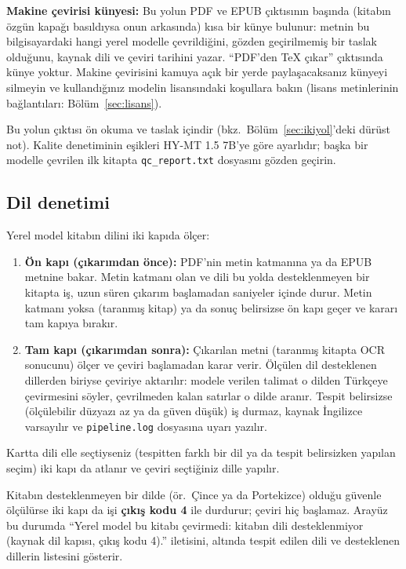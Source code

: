\documentclass[11pt,a4paper]{article}
\newcommand{\dosya}[1]{\texttt{#1}}
\begin{document}
\begin{notkutu}
\textbf{Makine çevirisi künyesi:} Bu yolun PDF ve EPUB çıktısının başında
(kitabın özgün kapağı basıldıysa onun arkasında) kısa bir künye bulunur:
metnin bu bilgisayardaki hangi yerel modelle çevrildiğini, gözden geçirilmemiş
bir taslak olduğunu, kaynak dili ve çeviri tarihini yazar. ``PDF'den TeX
çıkar'' çıktısında künye yoktur. Makine çevirisini kamuya açık bir yerde
paylaşacaksanız künyeyi silmeyin ve kullandığınız modelin lisansındaki
koşullara bakın (lisans metinlerinin bağlantıları: Bölüm~\ref{sec:lisans}).
\end{notkutu}

Bu yolun çıktısı ön okuma ve taslak içindir (bkz.\ Bölüm~\ref{sec:ikiyol}'deki
dürüst not). Kalite denetiminin eşikleri HY-MT 1.5 7B'ye göre ayarlıdır; başka
bir modelle çevrilen ilk kitapta \dosya{qc\_report.txt} dosyasını gözden
geçirin.

\subsection{Dil denetimi}\label{sec:dil}
Yerel model kitabın dilini iki kapıda ölçer:
\begin{enumerate}
  \item \textbf{Ön kapı (çıkarımdan önce):} PDF'nin metin katmanına ya da
        EPUB metnine bakar. Metin katmanı olan ve dili bu yolda
        desteklenmeyen bir kitapta iş, uzun süren çıkarım başlamadan
        saniyeler içinde durur. Metin katmanı yoksa (taranmış kitap) ya da
        sonuç belirsizse ön kapı geçer ve kararı tam kapıya bırakır.
  \item \textbf{Tam kapı (çıkarımdan sonra):} Çıkarılan metni (taranmış
        kitapta OCR sonucunu) ölçer ve çeviri başlamadan karar verir.
        Ölçülen dil desteklenen dillerden biriyse çeviriye aktarılır: modele
        verilen talimat o dilden Türkçeye çevirmesini söyler, çevrilmeden
        kalan satırlar o dilde aranır. Tespit belirsizse (ölçülebilir
        düzyazı az ya da güven düşük) iş durmaz, kaynak İngilizce varsayılır
        ve \dosya{pipeline.log} dosyasına uyarı yazılır.
\end{enumerate}
Kartta dili elle seçtiyseniz (tespitten farklı bir dil ya da tespit
belirsizken yapılan seçim) iki kapı da atlanır ve çeviri seçtiğiniz dille
yapılır.

Kitabın desteklenmeyen bir dilde (ör.\ Çince ya da Portekizce) olduğu
güvenle ölçülürse iki kapı da işi \textbf{çıkış kodu 4} ile durdurur; çeviri
hiç başlamaz. Arayüz bu durumda ``Yerel model bu kitabı çevirmedi: kitabın
dili desteklenmiyor (kaynak dil kapısı, çıkış kodu 4).'' iletisini, altında
tespit edilen dili ve desteklenen dillerin listesini gösterir.
\end{document}
